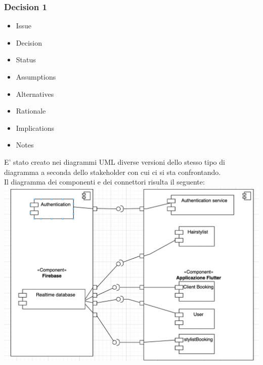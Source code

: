 \documentclass{article}
\begin{document}
\subsubsection{Decision 1}
\begin{itemize}
\item Issue 
\item Decision
\item Status 
\item Assumptions
\item Alternatives
\item Rationale
\item Implications    
\item Notes
\end{itemize}
E' stato creato nei diagrammi UML diverse versioni dello stesso tipo di diagramma a seconda dello stakeholder
con cui ci si sta confrontando.
\\Il diagramma dei componenti e dei connettori risulta il seguente:
\\\includegraphics[scale = 0.45]{"Immagini/SoftArch.png"}
\end{document}
